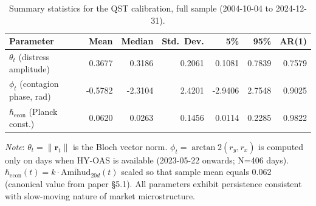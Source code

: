 \begin{table}[htbp]
\centering
\caption{Summary statistics for the QST calibration, full sample (2004-10-04 to 2024-12-31).}
\label{tab:qst-stats}
\begin{tabular}{lrrrrrr}
\hline
Parameter & Mean & Median & Std.\ Dev. & 5\% & 95\% & AR(1) \\
\hline
$\theta_t$ (distress amplitude)          & 0.3677 & 0.3186 & 0.2061 & 0.1081 & 0.7839 & 0.7579 \\
$\phi_t$ (contagion phase, rad)          & -0.5782 & -2.3104 & 2.4201 & -2.9406 & 2.7548 & 0.9025 \\
$\hbar_{\mathrm{econ}}$ (Planck const.)  & 0.0620 & 0.0263 & 0.1456 & 0.0114 & 0.2285 & 0.9822 \\
\hline
\end{tabular}

\medskip
\footnotesize
\textit{Note}: $\theta_t = \|\mathbf{r}_t\|$ is the Bloch vector norm.
$\phi_t = \arctan2(r_y, r_x)$ is computed only on days when HY-OAS is available (2023-05-22 onwards; N=406 days).
$\hbar_{\mathrm{econ}}(t) = k \cdot \overline{\text{Amihud}}_{20d}(t)$ scaled so that sample mean equals 0.062 (canonical value from paper §5.1).
All parameters exhibit persistence consistent with slow-moving nature of market microstructure.
\end{table}
